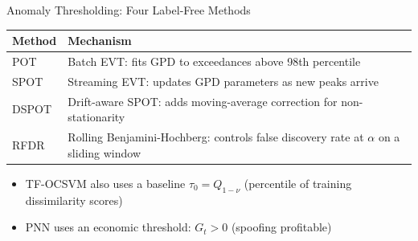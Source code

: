 \documentclass{beamer}
\begin{document}
\begin{frame}{Anomaly Thresholding: Four Label-Free Methods}
    \begin{table}[h]
    \centering
    \footnotesize
    \begin{tabular}{lp{6.5cm}}
    \toprule
    \textbf{Method} & \textbf{Mechanism} \\
    \midrule
    POT  & Batch EVT: fits GPD to exceedances above 98th percentile \\
    SPOT \cite{siffer:hal-01640325} & Streaming EVT: updates GPD parameters as new peaks arrive \\
    DSPOT \cite{siffer:hal-01640325} & Drift-aware SPOT: adds moving-average correction for non-stationarity \\
    RFDR & Rolling Benjamini-Hochberg: controls false discovery rate at $\alpha$ on a sliding window \\
    \bottomrule
    \end{tabular}
    \end{table}
    \begin{itemize}
        \item TF-OCSVM also uses a baseline $\tau_0 = Q_{1-\nu}$ (percentile of training dissimilarity scores)
        \item PNN uses an economic threshold: $G_t > 0$ (spoofing profitable)
    \end{itemize}
\end{frame}
\end{document}
